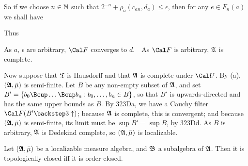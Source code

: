 {

\noindent So if we choose $n\in\Bbb N$ such that
$2^{-n}+\rho_a(c_{an},d_a)\le\epsilon$, then for any $e\in F_n(a)$ we
shall have


\noindent   Thus


\noindent As $a$, $\epsilon$ are arbitrary, $\Cal F$ converges to $d$.\
\QeD\  As $\Cal F$ is arbitrary, $\frak A$ is complete.

\medskip

 Now suppose that $\frak T$ is Hausdorff and that 
$\frak A$ is complete under $\Cal U$.   By (a), $(\frak A,\bar\mu)$ is
semi-finite.
Let $B$ be any non-empty subset of $\frak A$, and set
$B'=\{b_0\Bcup\ldots\Bcup b_n:b_0,\ldots,b_n\in B\}$, so that $B'$ is
upwards-directed and has the same upper bounds as $B$.   By 323Da, we
have a Cauchy filter $\Cal F(B'\backstep3\uparrow)$;  because $\frak A$
is complete, this is convergent;  and because $(\frak A,\bar\mu)$ is
semi-finite, its limit must be $\sup B'=\sup B$, by 323Dd.
As $B$ is arbitrary, $\frak A$ is Dedekind complete, so
$(\frak A,\bar\mu)$ is localizable.
}%

 Let $(\frak A,\bar\mu)$ be a localizable measure
algebra, and $\frak B$ a subalgebra of $\frak A$.   Then it is
topologically closed iff it is order-closed.

